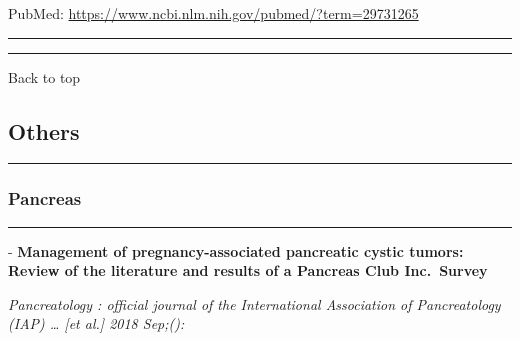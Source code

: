 \documentclass[]{article}
\begin{document}
PubMed: \url{https://www.ncbi.nlm.nih.gov/pubmed/?term=29731265}

{}

{}

\begin{center}\rule{0.5\linewidth}{\linethickness}\end{center}

\begin{center}\rule{0.5\linewidth}{\linethickness}\end{center}

Back to top

\pagebreak

\hypertarget{others}{%
\subsection{Others}\label{others}}

\begin{center}\rule{0.5\linewidth}{\linethickness}\end{center}

\hypertarget{pancreas-3}{%
\subsubsection{Pancreas}\label{pancreas-3}}

\begin{center}\rule{0.5\linewidth}{\linethickness}\end{center}

 - \textbf{Management of pregnancy-associated pancreatic cystic tumors:
Review of the literature and results of a Pancreas Club Inc.~Survey}

\emph{Pancreatology : official journal of the International Association
of Pancreatology (IAP) \ldots{} {[}et al.{]} 2018 Sep;():}
\end{document}
